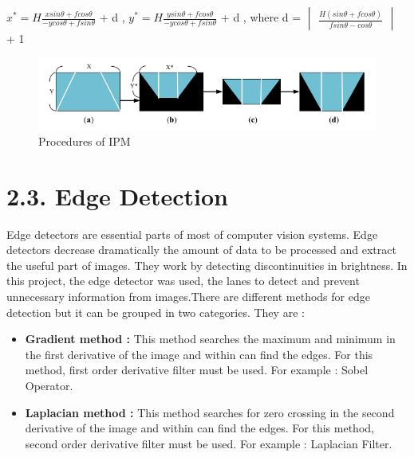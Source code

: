  \begin{center}
 $x^* = H \frac{x sin \theta + f cos \theta}{-y cos \theta + f sin \theta}$ + d ,
 $y^* = H \frac{y sin \theta + f cos \theta}{-y cos \theta + f sin \theta}$ + d ,
 where d = 
 $\begin{vmatrix}
 \frac{H(sin \theta + f cos \theta)}{f sin \theta - cos \theta}
 \end{vmatrix}$ + 1
\end{center}

\begin{figure}[H]
	\centering
	\hspace*{0cm}   
	\includegraphics[width=150mm,scale=1]{./Bilder/Procedures_of_IPM.png}
	\caption{Procedures of IPM \cite{IPM}}
\end{figure}

%
\section*{2.3. Edge Detection}\label{sec:Edge Detection}
%
Edge detectors are essential parts of most of computer vision systems. Edge detectors decrease dramatically the 
amount of data to be processed and extract the useful part of images. They work by detecting discontinuities in 
brightness.  In this project, the edge detector was used, the lanes to detect and prevent unnecessary information 
from images.There are different methods for edge detection but it can be grouped in two categories. They are :



\begin{itemize}

\item \textbf{Gradient method : } This method searches the maximum and minimum in the first derivative of the image 
and within can find the edges. For this method, first order derivative filter must be used. For example : Sobel 
Operator.
 
\item \textbf{Laplacian method : } This method searches for zero crossing in the second derivative of the image 
and within can find the edges. For this method, second order derivative filter must be used. For example : 
Laplacian Filter.
  
 \end{itemize}
 
